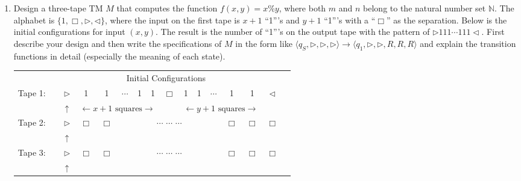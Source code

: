 \documentclass[12pt,a4paper]{article}
\theoremstyle{definition}
\numberwithin{equation}{section}
\numberwithin{figure}{section}
\begin{document}
\begin{enumerate}
\item Design a three-tape TM $M$ that computes the function $f(x,y) = x \% y$, where both $m$ and $n$ belong to the natural number set $\mathbb{N}$. The alphabet is $\{1, \Box, \triangleright, \triangleleft\}$, where the input on the first tape is $x+1$ ``1'''s and $y+1$ ``1'''s with a ``$\Box$'' as the separation. Below is the initial configurations for input $(x,y)$. The result is the number of ``1'''s on the output tape with the pattern of $\triangleright 111
\cdots 111\triangleleft$. First describe your design and then write the specifications of $M$ in the form like $\langle q_S, \triangleright, \triangleright, \triangleright \rangle \rightarrow \langle q_1, \triangleright, \triangleright, R, R, R\rangle$ and explain the transition functions in detail (especially the meaning of each state).

  \begin{tabular}{ll|c|c|c|c|c|c|c|c|c|c|c|c|c|c}
      & \multicolumn{14}{c}{Initial Configurations}\\[5pt]
      \cline{2-16}
      Tape 1:& & $\triangleright$ &  1  & 1 & $\cdots$ & 1 & 1 & $\Box$ & 1 & 1 & $\cdots$ & 1 & 1 & $ \triangleleft$ & \\
      \cline{2-16}
      \multicolumn{2}{c}{} & \multicolumn{1}{c}{$\uparrow$} & \multicolumn{5}{c}{\color{blue}$\leftarrow x+1 \mbox{ squares}\rightarrow$} & \multicolumn{1}{c}{} & \multicolumn{5}{c}{\color{blue}$\leftarrow y+1 \mbox{ squares}\rightarrow$} & \multicolumn{2}{c}{}\\[4pt]
      \cline{2-16}
      Tape 2:& & $\triangleright$ & $\Box$ & $\Box$ & \multicolumn{7}{c|}{$\cdots$ \quad $\cdots$ \quad $\cdots$} & $\Box$ & $\Box$ & $\Box$ &\\
      \cline{2-16}
      \multicolumn{2}{c}{} & \multicolumn{1}{c}{$\uparrow$} & \multicolumn{11}{c}{}\\[4pt]
      \cline{2-16}
      Tape 3:& & $\triangleright$ & $\Box$ & $\Box$ & \multicolumn{7}{c|}{$\cdots$ \quad $\cdots$ \quad $\cdots$} & $\Box$ & $\Box$ & $\Box$ &\\
      \cline{2-16}
      \multicolumn{2}{c}{} & \multicolumn{1}{c}{$\uparrow$} & \multicolumn{13}{c}{}\\
      \end{tabular}


\end{enumerate}
\end{document}
